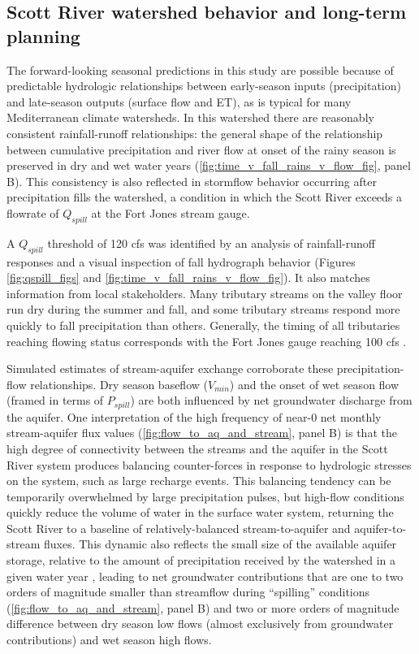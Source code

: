 \documentclass[hess, manuscript]{copernicus}
\begin{document}
\subsection{Scott River watershed behavior and long-term planning}

The forward-looking seasonal predictions in this study are possible
because of predictable hydrologic relationships between early-season
inputs (precipitation) and late-season outputs (surface flow and ET), as
is typical for many Mediterranean climate watersheds. In this watershed
there are reasonably consistent rainfall-runoff relationships: the
general shape of the relationship between cumulative precipitation and
river flow at onset of the rainy season is preserved in dry and wet
water years (\autoref{fig:time_v_fall_rains_v_flow_fig}, panel B). This
consistency is also reflected in stormflow behavior occurring after
precipitation fills the watershed, a condition in which the Scott River
exceeds a flowrate of \(Q_{spill}\) at the Fort Jones stream gauge.

A \(Q_{spill}\) threshold of 120 cfs was identified by an analysis of
rainfall-runoff responses and a visual inspection of fall hydrograph
behavior (Figures \ref{fig:qspill_figs} and
\ref{fig:time_v_fall_rains_v_flow_fig}). It also matches information
from local stakeholders. Many tributary streams on the valley floor run
dry during the summer and fall, and some tributary streams respond more
quickly to fall precipitation than others. Generally, the timing of all
tributaries reaching flowing status corresponds with the Fort Jones
gauge reaching 100 cfs \citep{Sommarstrom2020}.

Simulated estimates of stream-aquifer exchange corroborate these
precipitation-flow relationships. Dry season baseflow (\(V_{min}\)) and
the onset of wet season flow (framed in terms of \(P_{spill}\)) are both
influenced by net groundwater discharge from the aquifer. One
interpretation of the high frequency of near-0 net monthly
stream-aquifer flux values (\autoref{fig:flow_to_aq_and_stream}, panel
B) is that the high degree of connectivity between the streams and the
aquifer in the Scott River system produces balancing counter-forces in
response to hydrologic stresses on the system, such as large recharge
events. This balancing tendency can be temporarily overwhelmed by large
precipitation pulses, but high-flow conditions quickly reduce the volume
of water in the surface water system, returning the Scott River to a
baseline of relatively-balanced stream-to-aquifer and aquifer-to-stream
fluxes. This dynamic also reflects the small size of the available
aquifer storage, relative to the amount of precipitation received by the
watershed in a given water year \citeyearpar[DWR][]{DWR2004}, leading to
net groundwater contributions that are one to two orders of magnitude
smaller than streamflow during ``spilling'' conditions
(\autoref{fig:flow_to_aq_and_stream}, panel B) and two or more orders of
magnitude difference between dry season low flows (almost exclusively
from groundwater contributions) and wet season high flows.
\end{document}
